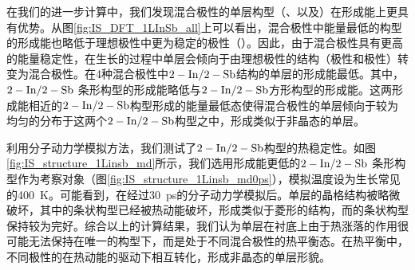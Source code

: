 在我们的进一步计算中，我们发现混合极性的单层构型（、以及）在形成能上更具有优势。从图\ref{fig:IS_DFT_1LInSb_all}上可以看出，混合极性中能量最低的构型的形成能也略低于理想极性中更为稳定的极性（）。因此，由于混合极性具有更高的能量稳定性，在生长的过程中单层会倾向于由理想极性的结构（极性和极性）转变为混合极性。在4种混合极性中$\rm 2-In/2-Sb$结构的单层的形成能最低。其中，$\rm 2-In/2-Sb$ 条形构型的形成能略低与$\rm 2-In/2-Sb$方形构型的形成能。这两形成能相近的$\rm 2-In/2-Sb$构型形成的能量最低态使得混合极性的单层倾向于较为均匀的分布于这两个$\rm 2-In/2-Sb$构型之中，形成类似于非晶态的单层。

利用分子动力学模拟方法，我们测试了$\rm 2-In/2-Sb$构型的热稳定性。如图\ref{fig:IS_structure_1Linsb_md}所示，我们选用形成能更低的$\rm 2-In/2-Sb$ 条形构型作为考察对象（图\ref{fig:IS_structure_1Linsb_md0ps}），模拟温度设为生长常见的\SI{400}{\kelvin}。可能看到，在经过\SI{30}{\pico\second}的分子动力学模拟后。单层的晶格结构被略微破坏，其中的条状构型已经被热动能破坏，形成类似于菱形的结构，而的条状构型保持较为完好。综合以上的计算结果，我们认为单层在衬底上由于热涨落的作用很可能无法保持在唯一的构型下，而是处于不同混合极性的热平衡态。在热平衡中，不同极性的在热动能的驱动下相互转化，形成非晶态的单层形貌。

